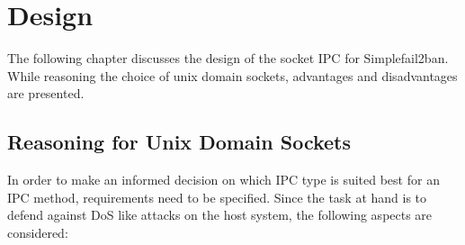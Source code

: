 %
%

\chapter{Design}
\label{cha:design}
The following chapter discusses the design of the socket IPC for Simplefail2ban.
While reasoning the choice of unix domain sockets, advantages and disadvantages are presented.

\section{Reasoning for Unix Domain Sockets}
In order to make an informed decision on which IPC type is suited best for an IPC method, requirements need to be specified.
Since the task at hand is to defend against DoS like attacks on the host system, the following aspects are considered\cite{raatschen:ipc}:

